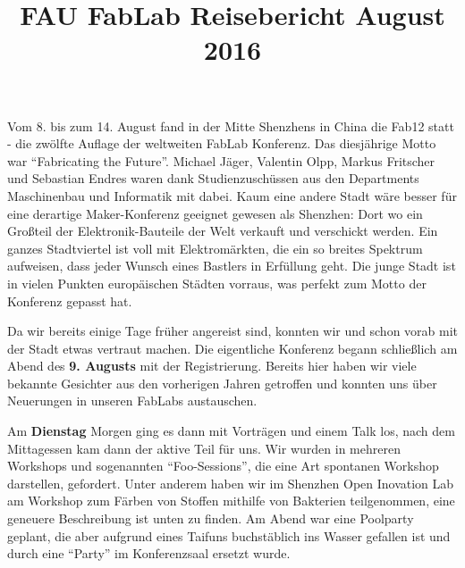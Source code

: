 \documentclass{\basedir/fablab-document}
\title{FAU FabLab Reisebericht August 2016}
\begin{document}
\begin{figure}[htbp]
	\noindent{}
\end{figure}

\section*{}

Vom 8. bis zum 14. August fand in der Mitte Shenzhens in China die Fab12
statt - die zwölfte Auflage der weltweiten FabLab Konferenz. Das
diesjährige Motto war ``Fabricating the Future''. Michael Jäger,
Valentin Olpp, Markus Fritscher und Sebastian Endres waren dank
Studienzuschüssen aus den Departments Maschinenbau und Informatik mit
dabei. Kaum eine andere Stadt wäre besser für eine derartige
Maker-Konferenz geeignet gewesen als Shenzhen: Dort wo ein Großteil der
Elektronik-Bauteile der Welt verkauft und verschickt werden. Ein ganzes
Stadtviertel ist voll mit Elektromärkten, die ein so breites Spektrum
aufweisen, dass jeder Wunsch eines Bastlers in Erfüllung geht. Die junge
Stadt ist in vielen Punkten europäischen Städten vorraus, was perfekt
zum Motto der Konferenz gepasst hat.

Da wir bereits einige Tage früher angereist sind, konnten wir und schon
vorab mit der Stadt etwas vertraut machen. Die eigentliche Konferenz
begann schließlich am Abend des \textbf{9. Augusts} mit der
Registrierung. Bereits hier haben wir viele bekannte Gesichter aus den
vorherigen Jahren getroffen und konnten uns über Neuerungen in unseren
FabLabs austauschen.

Am \textbf{Dienstag} Morgen ging es dann mit Vorträgen und einem Talk
los, nach dem Mittagessen kam dann der aktive Teil für uns. Wir wurden
in mehreren Workshops und sogenannten ``Foo-Sessions'', die eine Art
spontanen Workshop darstellen, gefordert. Unter anderem haben wir im
Shenzhen Open Inovation Lab am Workshop zum Färben von Stoffen mithilfe
von Bakterien teilgenommen, eine geneuere Beschreibung ist unten zu
finden. Am Abend war eine Poolparty geplant, die aber aufgrund eines
Taifuns buchstäblich ins Wasser gefallen ist und durch eine ``Party'' im
Konferenzsaal ersetzt wurde.
\end{document}
